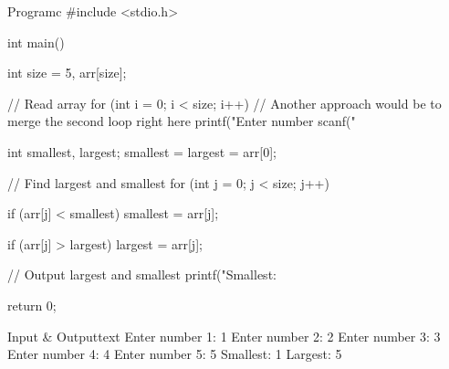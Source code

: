 \documentclass[11pt]{ipu-c}
\begin{document}
    \newpage
    \begin{code}
        {Program}{c}
#include <stdio.h>

int main() {
    int size = 5, arr[size];

    // Read array
    for (int i = 0; i < size; i++) {
        // Another approach would be to merge the second loop right here
        printf("Enter number %
        scanf("%
    }

    int smallest, largest;
    smallest = largest = arr[0];

    // Find largest and smallest
    for (int j = 0; j < size; j++) {
        if (arr[j] < smallest) {
            smallest = arr[j];
        }

        if (arr[j] > largest) {
            largest = arr[j];
        }
    }

    // Output largest and smallest
    printf("Smallest: %

    return 0;
}
    \end{code}
    \begin{code}
        {Input \& Output}{text}
Enter number 1: 1
Enter number 2: 2
Enter number 3: 3
Enter number 4: 4
Enter number 5: 5
Smallest: 1
Largest: 5
    \end{code}
\end{document}
